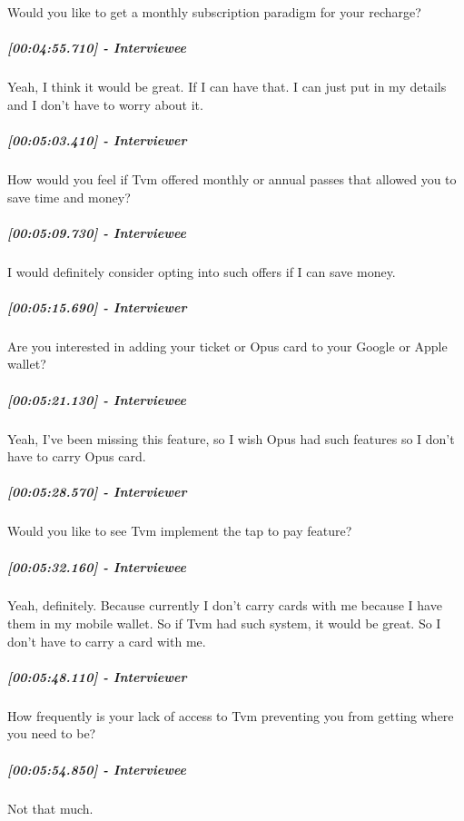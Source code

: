 \documentclass[a4paper,12pt]{article}
\begin{document}
Would you like to get a monthly subscription paradigm for your recharge?

\hypertarget{interviewee-20}{%
\subparagraph{{[}00:04:55.710{]} - Interviewee}\label{interviewee-20}}

Yeah, I think it would be great. If I can have that. I can just put in
my details and I don't have to worry about it.

\hypertarget{interviewer-21}{%
\subparagraph{{[}00:05:03.410{]} - Interviewer}\label{interviewer-21}}

How would you feel if Tvm offered monthly or annual passes that allowed
you to save time and money?

\hypertarget{interviewee-21}{%
\subparagraph{{[}00:05:09.730{]} - Interviewee}\label{interviewee-21}}

I would definitely consider opting into such offers if I can save money.

\hypertarget{interviewer-22}{%
\subparagraph{{[}00:05:15.690{]} - Interviewer}\label{interviewer-22}}

Are you interested in adding your ticket or Opus card to your Google or
Apple wallet?

\hypertarget{interviewee-22}{%
\subparagraph{{[}00:05:21.130{]} - Interviewee}\label{interviewee-22}}

Yeah, I've been missing this feature, so I wish Opus had such features
so I don't have to carry Opus card.

\hypertarget{interviewer-23}{%
\subparagraph{{[}00:05:28.570{]} - Interviewer}\label{interviewer-23}}

Would you like to see Tvm implement the tap to pay feature?

\hypertarget{interviewee-23}{%
\subparagraph{{[}00:05:32.160{]} - Interviewee}\label{interviewee-23}}

Yeah, definitely. Because currently I don't carry cards with me because
I have them in my mobile wallet. So if Tvm had such system, it would be
great. So I don't have to carry a card with me.

\hypertarget{interviewer-24}{%
\subparagraph{{[}00:05:48.110{]} - Interviewer}\label{interviewer-24}}

How frequently is your lack of access to Tvm preventing you from getting
where you need to be?

\hypertarget{interviewee-24}{%
\subparagraph{{[}00:05:54.850{]} - Interviewee}\label{interviewee-24}}

Not that much.
\end{document}
